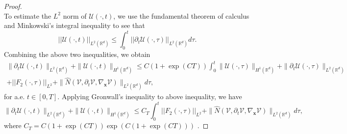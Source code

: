 \documentclass[11pt,reqno,oneside]{amsart}
\numberwithin{equation}{section}
\theoremstyle{definition}
\theoremstyle{remark}
\numberwithin{equation}{section}
\begin{document}
\begin{proof}
\begin{equation*}
		\end{equation*}
		To estimate the $L^2$ norm of $\mathscr{U}(\cdot,t)$, we  use the fundamental theorem of calculus and Minkowski's integral inequality to see that 
		\begin{equation*}\label{eq:4.9}
			||\mathscr{U}(\cdot,t)||_{L^2(\mathbb{R}^d)}\leqslant \int_{0}^{t}||\partial_{t}\mathscr{U}(\cdot,\tau)||_{L^2(\mathbb{R}^d)} d\tau.
		\end{equation*}
		Combining the above two inequalities, we obtain 
		\begin{equation*}
			\begin{aligned}
				\|\partial_{t}\mathscr{U}(\cdot,t)\|_{L^2(\mathbb{R}^d)}+\|\mathscr{U}(\cdot,t)\|_{H^1(\mathbb{R}^d)} 
				\leqslant C\left(1+\exp(CT)\right)\int_{0}^{t}  \|\mathscr{U}(\cdot,\tau)\|_{H^1(\mathbb{R}^d)} + \|\partial_{t}\mathscr{U}(\cdot,\tau)\|_{L^2(\mathbb{R}^d)}\\
				+||F_2(\cdot,\tau)||_{L^2}+\|\hat{N}(\mathscr{V},\partial_{t}\mathscr{V},\nabla_\mathbf{x}\mathscr{V})\|_{L^2(\mathbb{R}^d)}d\tau ,
			\end{aligned}
		\end{equation*}
		for a.e. $t \in [0,T]$. Applying Gronwall's inequality to above inequality, we have
		\begin{equation}\label{eq:4.9 }
			\|\partial_{t}\mathscr{U}(\cdot,t)\|_{L^2(\mathbb{R}^d)} + \|\mathscr{U}(\cdot,t)\|_{H^1(\mathbb{R}^d)} \leqslant C_T \int_{0}^{t} ||F_2(\cdot,\tau)||_{L^2}+\|\hat{N}(\mathscr{V},\partial_{t}\mathscr{V},\nabla_\mathbf{x}\mathscr{V})\|_{L^2(\mathbb{R}^d)}d\tau ,
		\end{equation}
		where $C_T=C\left(1+\exp(CT)\right) \exp(C\left(1+\exp(CT)\right))$ .
		

\end{proof}
\end{document}
